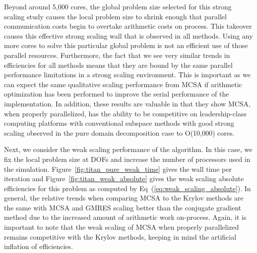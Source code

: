 Beyond around 5,000 cores, the global problem size selected for this
strong scaling study causes the local problem size to shrink enough
that parallel communication costs begin to overtake arithmetic costs
on process. This takeover causes this effective strong scaling wall
that is observed in all methods. Using any more cores to solve this
particular global problem is not an efficient use of those parallel
resources. Furthermore, the fact that we see very similar trends in
efficiencies for all methods means that they are bound by the same
parallel performance limitations in a strong scaling environment. This
is important as we can expect the same qualitative scaling performance
from MCSA if arithmetic optimization has been performed to improve the
serial performance of the implementation. In addition, these results
are valuable in that they show MCSA, when properly parallelized, has
the ability to be competitive on leadership-class computing platforms
with conventional subspace methods with good strong scaling observed
in the pure domain decomposition case to O(10,000) cores.

Next, we consider the weak scaling performance of the algorithm. In
this case, we fix the local problem size at  DOFs and
increase the number of processors used in the
simulation. Figure~\ref{fig:titan_pure_weak_time} gives the wall time
per iteration and Figure~\ref{fig:titan_weak_absolute} gives the weak
scaling absolute efficiencies for this problem as computed by
Eq~(\ref{eq:weak_scaling_absolute}). In general, the relative trends
when comparing MCSA to the Krylov methods are the same with MCSA and
GMRES scaling better than the conjugate gradient method due to the
increased amount of arithmetic work on-process. Again, it is important
to note that the weak scaling of MCSA when properly parallelized
remains competitive with the Krylov methods, keeping in mind the
artificial inflation of efficiencies.

